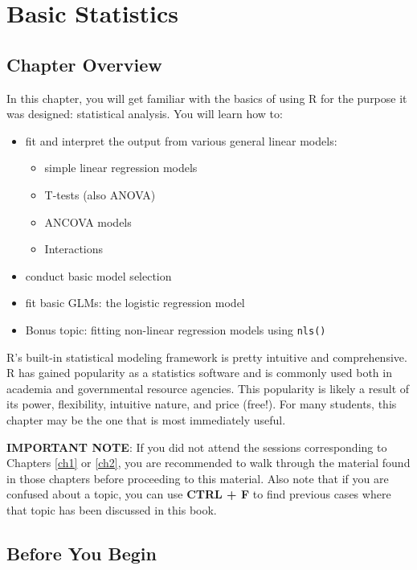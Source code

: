 \documentclass[]{book}
\providecommand{\tightlist}{%
  \setlength{\itemsep}{0pt}\setlength{\parskip}{0pt}}
\theoremstyle{definition}
\theoremstyle{definition}
\theoremstyle{definition}
\theoremstyle{remark}
\begin{document}
\chapter{Basic Statistics}\label{ch3}

\section*{Chapter Overview}\label{chapter-overview-2}

In this chapter, you will get familiar with the basics of using R for
the purpose it was designed: statistical analysis. You will learn how
to:

\begin{itemize}
\tightlist
\item
  fit and interpret the output from various general linear models:

  \begin{itemize}
  \tightlist
  \item
    simple linear regression models
  \item
    T-tests (also ANOVA)
  \item
    ANCOVA models
  \item
    Interactions
  \end{itemize}
\item
  conduct basic model selection
\item
  fit basic GLMs: the logistic regression model
\item
  Bonus topic: fitting non-linear regression models using \texttt{nls()}
\end{itemize}

R's built-in statistical modeling framework is pretty intuitive and
comprehensive. R has gained popularity as a statistics software and is
commonly used both in academia and governmental resource agencies. This
popularity is likely a result of its power, flexibility, intuitive
nature, and price (free!). For many students, this chapter may be the
one that is most immediately useful.

\textbf{IMPORTANT NOTE}: If you did not attend the sessions
corresponding to Chapters \ref{ch1} or \ref{ch2}, you are recommended to
walk through the material found in those chapters before proceeding to
this material. Also note that if you are confused about a topic, you can
use \textbf{CTRL + F} to find previous cases where that topic has been
discussed in this book.

\section*{Before You Begin}\label{before-you-begin-1}
\end{document}
